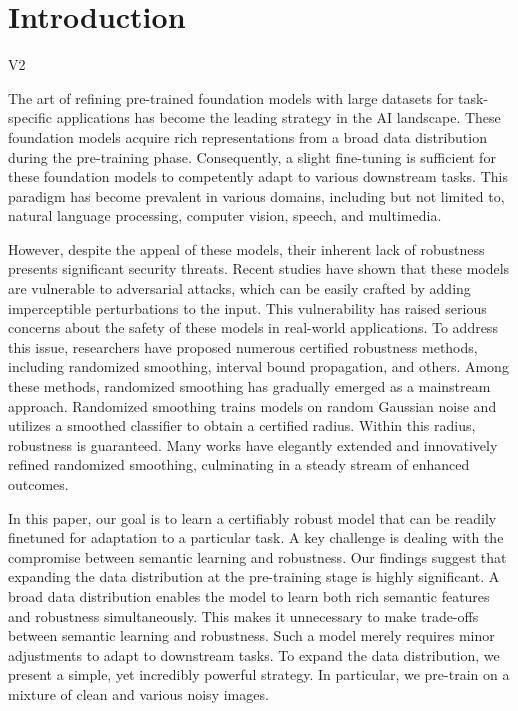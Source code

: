 \section{Introduction}
\label{sec:intro}

V2

The art of refining pre-trained foundation models with large datasets for task-specific applications has become the leading strategy in the AI landscape. 
These foundation models acquire rich representations from a broad data distribution during the pre-training phase.
Consequently, a slight fine-tuning is sufficient for these foundation models to competently adapt to various downstream tasks.
This paradigm has become prevalent in various domains, including but not limited to, natural language processing, computer vision, speech, and multimedia.


However, despite the appeal of these models, their inherent lack of robustness presents significant security threats.
Recent studies have shown that these models are vulnerable to adversarial attacks, which can be easily crafted by adding imperceptible perturbations to the input.
This vulnerability has raised serious concerns about the safety of these models in real-world applications.
To address this issue, researchers have proposed numerous certified robustness methods, including randomized smoothing, interval bound propagation, and others.
Among these methods, randomized smoothing has gradually emerged as a mainstream approach.
Randomized smoothing trains models on random Gaussian noise and utilizes a smoothed classifier to obtain a certified radius. Within this radius, robustness is guaranteed.
Many works have elegantly extended and innovatively refined randomized smoothing, culminating in a steady stream of enhanced outcomes.


In this paper, our goal is to learn a certifiably robust model that can be readily finetuned for adaptation to a particular task.
A key challenge is dealing with the compromise between semantic learning and robustness.
Our findings suggest that expanding the data distribution at the pre-training stage is highly significant.
A broad data distribution enables the model to learn both rich semantic features and robustness simultaneously.
This makes it unnecessary to make trade-offs between semantic learning and robustness.
Such a model merely requires minor adjustments to adapt to downstream tasks.
To expand the data distribution, we present a simple, yet incredibly powerful strategy.
In particular, we pre-train on a mixture of clean and various noisy images.


